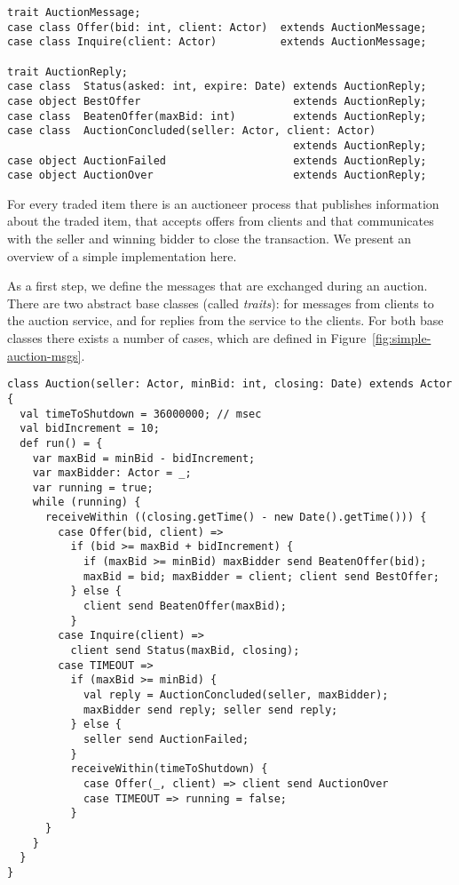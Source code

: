 \documentclass[a4paper,12pt,twoside,titlepage]{book}
\begin{document}
\begin{lstlisting}[style=floating,label=fig:simple-auction-msgs,caption=Implementation of an Auction Service]
trait AuctionMessage;
case class Offer(bid: int, client: Actor)  extends AuctionMessage;
case class Inquire(client: Actor)          extends AuctionMessage;       

trait AuctionReply;
case class  Status(asked: int, expire: Date) extends AuctionReply;
case object BestOffer                        extends AuctionReply;
case class  BeatenOffer(maxBid: int)         extends AuctionReply;
case class  AuctionConcluded(seller: Actor, client: Actor) 
                                             extends AuctionReply;
case object AuctionFailed                    extends AuctionReply;
case object AuctionOver                      extends AuctionReply;
\end{lstlisting}

For every traded item there is an auctioneer process that publishes
information about the traded item, that accepts offers from clients
and that communicates with the seller and winning bidder to close the
transaction. We present an overview of a simple implementation
here.

As a first step, we define the messages that are exchanged during an
auction. There are two abstract base classes (called {\em traits}):
 for messages from clients to the auction
service, and  for replies from the service to the
clients.  For both base classes there exists a number of cases, which
are defined in Figure~\ref{fig:simple-auction-msgs}.

\begin{lstlisting}[style=floating,label=fig:simple-auction,caption=Implementation of an Auction Service]
class Auction(seller: Actor, minBid: int, closing: Date) extends Actor {
  val timeToShutdown = 36000000; // msec
  val bidIncrement = 10;
  def run() = {
    var maxBid = minBid - bidIncrement;
    var maxBidder: Actor = _;
    var running = true;
    while (running) {
      receiveWithin ((closing.getTime() - new Date().getTime())) {
        case Offer(bid, client) =>
          if (bid >= maxBid + bidIncrement) { 
            if (maxBid >= minBid) maxBidder send BeatenOffer(bid);
            maxBid = bid; maxBidder = client; client send BestOffer;
          } else {
            client send BeatenOffer(maxBid);
          }
        case Inquire(client) =>
          client send Status(maxBid, closing);
        case TIMEOUT =>
          if (maxBid >= minBid) {
            val reply = AuctionConcluded(seller, maxBidder);
            maxBidder send reply; seller send reply;
          } else {
            seller send AuctionFailed;
          }
          receiveWithin(timeToShutdown) {
            case Offer(_, client) => client send AuctionOver
            case TIMEOUT => running = false;
          }
      }
    }
  } 
}
\end{lstlisting}
\end{document}
